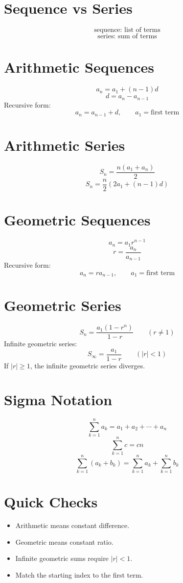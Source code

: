 \documentclass[11pt]{article}
\begin{document}

\section*{Sequence vs Series}
\[
\text{sequence: list of terms}
\]
\[
\text{series: sum of terms}
\]

\section*{Arithmetic Sequences}
\[
a_n=a_1+(n-1)d
\]
\[
d=a_n-a_{n-1}
\]
Recursive form:
\[
a_n=a_{n-1}+d,\qquad a_1=\text{first term}
\]

\section*{Arithmetic Series}
\[
S_n=\frac{n(a_1+a_n)}2
\]
\[
S_n=\frac n2\left(2a_1+(n-1)d\right)
\]

\section*{Geometric Sequences}
\[
a_n=a_1r^{n-1}
\]
\[
r=\frac{a_n}{a_{n-1}}
\]
Recursive form:
\[
a_n=ra_{n-1},\qquad a_1=\text{first term}
\]

\section*{Geometric Series}
\[
S_n=\frac{a_1(1-r^n)}{1-r}\qquad (r\ne1)
\]
Infinite geometric series:
\[
S_\infty=\frac{a_1}{1-r}\qquad (|r|<1)
\]
If $|r|\ge1$, the infinite geometric series diverges.

\section*{Sigma Notation}
\[
\sum_{k=1}^{n} a_k=a_1+a_2+\cdots+a_n
\]
\[
\sum_{k=1}^{n} c=cn
\]
\[
\sum_{k=1}^{n} (a_k+b_k)=\sum_{k=1}^{n}a_k+\sum_{k=1}^{n}b_k
\]

\section*{Quick Checks}
\begin{itemize}
  \item Arithmetic means constant difference.
  \item Geometric means constant ratio.
  \item Infinite geometric sums require $|r|<1$.
  \item Match the starting index to the first term.
\end{itemize}
\end{document}
